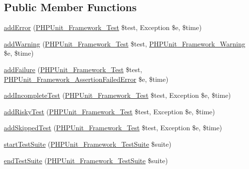 \subsection*{Public Member Functions}
\begin{DoxyCompactItemize}
\item 
\mbox{\hyperlink{class_framework___test_listener_test_a320d7bc7d2f9264ee7ba7aca6fd2df41}{add\+Error}} (\mbox{\hyperlink{interface_p_h_p_unit___framework___test}{P\+H\+P\+Unit\+\_\+\+Framework\+\_\+\+Test}} \$test, Exception \$e, \$time)
\item 
\mbox{\hyperlink{class_framework___test_listener_test_a6c3d134992c5b03573561ef82e7f743d}{add\+Warning}} (\mbox{\hyperlink{interface_p_h_p_unit___framework___test}{P\+H\+P\+Unit\+\_\+\+Framework\+\_\+\+Test}} \$test, \mbox{\hyperlink{class_p_h_p_unit___framework___warning}{P\+H\+P\+Unit\+\_\+\+Framework\+\_\+\+Warning}} \$e, \$time)
\item 
\mbox{\hyperlink{class_framework___test_listener_test_a668f17b68705c5c8686bac690a6f719d}{add\+Failure}} (\mbox{\hyperlink{interface_p_h_p_unit___framework___test}{P\+H\+P\+Unit\+\_\+\+Framework\+\_\+\+Test}} \$test, \mbox{\hyperlink{class_p_h_p_unit___framework___assertion_failed_error}{P\+H\+P\+Unit\+\_\+\+Framework\+\_\+\+Assertion\+Failed\+Error}} \$e, \$time)
\item 
\mbox{\hyperlink{class_framework___test_listener_test_a81bfe09a62194fe5769ca1cc36ee428b}{add\+Incomplete\+Test}} (\mbox{\hyperlink{interface_p_h_p_unit___framework___test}{P\+H\+P\+Unit\+\_\+\+Framework\+\_\+\+Test}} \$test, Exception \$e, \$time)
\item 
\mbox{\hyperlink{class_framework___test_listener_test_ad161e7d13b117cb0af3967cd2adc6bba}{add\+Risky\+Test}} (\mbox{\hyperlink{interface_p_h_p_unit___framework___test}{P\+H\+P\+Unit\+\_\+\+Framework\+\_\+\+Test}} \$test, Exception \$e, \$time)
\item 
\mbox{\hyperlink{class_framework___test_listener_test_a1c0cb3bc58e5807530daf3a93783ed4e}{add\+Skipped\+Test}} (\mbox{\hyperlink{interface_p_h_p_unit___framework___test}{P\+H\+P\+Unit\+\_\+\+Framework\+\_\+\+Test}} \$test, Exception \$e, \$time)
\item 
\mbox{\hyperlink{class_framework___test_listener_test_a901a86a623d83184267b21f2daee0ff5}{start\+Test\+Suite}} (\mbox{\hyperlink{class_p_h_p_unit___framework___test_suite}{P\+H\+P\+Unit\+\_\+\+Framework\+\_\+\+Test\+Suite}} \$suite)
\item 
\mbox{\hyperlink{class_framework___test_listener_test_aeec28a4d1328434916ebcdc1ca6b5527}{end\+Test\+Suite}} (\mbox{\hyperlink{class_p_h_p_unit___framework___test_suite}{P\+H\+P\+Unit\+\_\+\+Framework\+\_\+\+Test\+Suite}} \$suite)

\end{DoxyCompactItemize}
